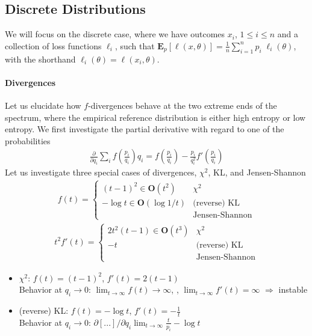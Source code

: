 \documentclass{article}
\newcommand{\E}{{\mathbf E}}
\begin{document}
\subsection{Discrete Distributions}

We will focus on the discrete case, where we have outcomes $x_i$, $1 \leq i \leq n$ and a collection of loss functions $\ell_i$, such that $\E_p[\ell(x,\theta)] = \frac 1n \sum_{i=1}^n  p_i \; \ell_i(\theta)$, with the shorthand $\ell_i(\theta) = \ell(x_i,\theta)$. 

\paragraph{Divergences}

Let us elucidate how $f$-divergences behave at the two extreme ends of the spectrum, where the empirical reference distribution is either high entropy or low entropy. We first investigate the partial derivative with regard to one of the probabilities
\begin{align}
\frac{\partial}{\partial q_i} \sum_i f\left( \frac{p_i}{q_i} \right) q_i  
=   f \left( \frac{p_i}{q_i} \right) - \frac{p_i}{q_i^2}  f'\left(\frac {p_i}{q_i} \right) 
\end{align}
Let us investigate three special cases of divergences, $\chi^2$, KL, and Jensen-Shannon
\begin{align}
f(t)  = 
\begin{cases} 
	 (t-1)^2 \in \mathbf O(t^2)  		& \text{$\chi^2$} \\
	 -\log t \in \mathbf O(\log 1/t) 	& \text{(reverse) KL}  \\
						  	& \text{Jensen-Shannon} 
\end{cases} 
\end{align}
%
\begin{align}
t^2 f'(t)  = 
\begin{cases} 
	2 t^2 (t-1) \in \mathbf O(t^3) 	& \text{$\chi^2$} \\
	- t						& \text{(reverse) KL}  \\
	  						& \text{Jensen-Shannon} 
\end{cases}
\end{align}

\begin{itemize}
\item $\chi^2$: $f(t)=(t-1)^2$, $f'(t) = 2(t-1)$ \\
Behavior at $q_i\to 0$: $\lim_{t \to \infty} f(t) \to \infty$, , $\lim_{t \to \infty} f'(t) = \infty$ $\Longrightarrow$ instable
%
\item (reverse) KL: $f(t) = -\log t$, $f'(t) = -\frac{1}{t}$ \\
Behavior at $q_i\to 0$: $\partial[...]/\partial q_i \lim_{t \to \infty} \frac t{p_i} - \log t $
\end{itemize}
\end{document}
